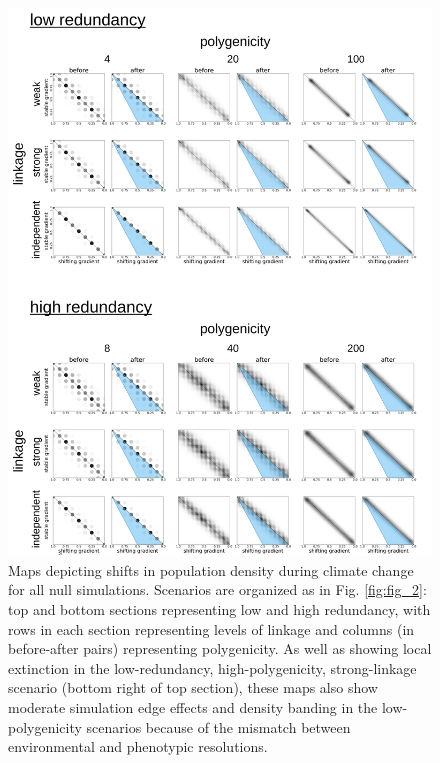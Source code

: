 \documentclass[9pt,twocolumn,twoside,lineno]{pnas-new}
\begin{document}
\begin{figure}
\centering
\includegraphics[width=.8\linewidth]{pub/figs/FIG_S3_phenotypic_shift_null.jpg}
    \caption{Maps depicting shifts in population density during climate change for all null simulations. Scenarios are organized as in Fig. \ref{fig:fig_2}: top and bottom sections representing low and high redundancy, with rows in each section representing levels of linkage and columns (in before-after pairs) representing polygenicity. As well as showing local extinction in the low-redundancy, high-polygenicity, strong-linkage scenario (bottom right of top section), these maps also show moderate simulation edge effects and density banding in the low-polygenicity scenarios because of the mismatch between environmental and phenotypic resolutions.}
\label{fig:fig_s3}
\end{figure}
\end{document}
